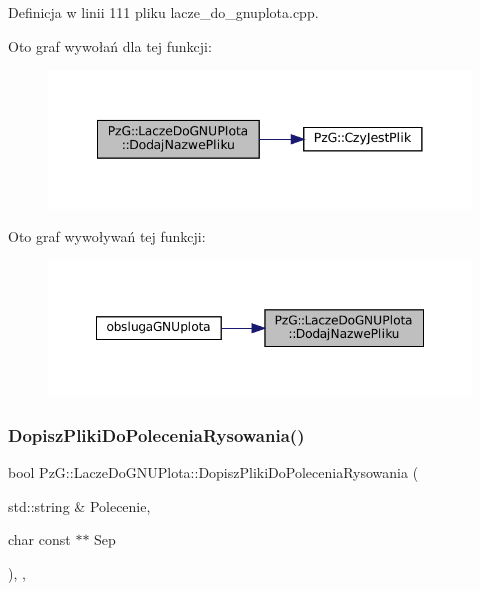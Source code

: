 Definicja w linii 111 pliku lacze\+\_\+do\+\_\+gnuplota.\+cpp.

Oto graf wywołań dla tej funkcji\+:\nopagebreak
\begin{figure}[H]
\begin{center}
\leavevmode
\includegraphics[width=341pt]{class_pz_g_1_1_lacze_do_g_n_u_plota_a34bd48f57c0fd69c12bf4127a1cacd8f_cgraph}
\end{center}
\end{figure}
Oto graf wywoływań tej funkcji\+:\nopagebreak
\begin{figure}[H]
\begin{center}
\leavevmode
\includegraphics[width=348pt]{class_pz_g_1_1_lacze_do_g_n_u_plota_a34bd48f57c0fd69c12bf4127a1cacd8f_icgraph}
\end{center}
\end{figure}
\mbox{\label{class_pz_g_1_1_lacze_do_g_n_u_plota_a25585ec3f1bd3b6bf42f374c38b8d237}} 
\subsubsection{\texorpdfstring{DopiszPlikiDoPoleceniaRysowania()}{DopiszPlikiDoPoleceniaRysowania()}}
{\footnotesize\ttfamily bool Pz\+G\+::\+Lacze\+Do\+G\+N\+U\+Plota\+::\+Dopisz\+Pliki\+Do\+Polecenia\+Rysowania (\begin{DoxyParamCaption}\item[{std\+::string \&}]{Polecenie,  }\item[{char const $\ast$$\ast$}]{Sep }\end{DoxyParamCaption})\hspace{0.3cm}{\ttfamily [inline]}, {\ttfamily [protected]}, {\ttfamily [virtual]}}

